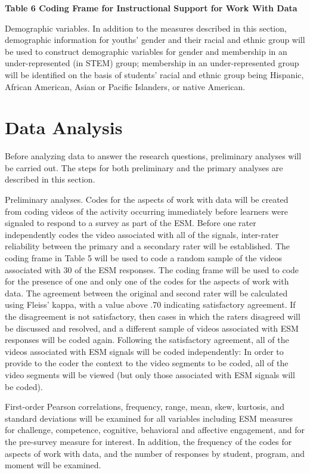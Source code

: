 \documentclass[]{book}
\theoremstyle{definition}
\theoremstyle{definition}
\theoremstyle{definition}
\theoremstyle{remark}
\begin{document}
\textbf{Table 6 Coding Frame for Instructional Support for Work With
Data}

Demographic variables. In addition to the measures described in this
section, demographic information for youths' gender and their racial and
ethnic group will be used to construct demographic variables for gender
and membership in an under-represented (in STEM) group; membership in an
under-represented group will be identified on the basis of students'
racial and ethnic group being Hispanic, African American, Asian or
Pacific Islanders, or native American.

\section{Data Analysis}\label{data-analysis}

Before analyzing data to answer the research questions, preliminary
analyses will be carried out. The steps for both preliminary and the
primary analyses are described in this section.

Preliminary analyses. Codes for the aspects of work with data will be
created from coding videos of the activity occurring immediately before
learners were signaled to respond to a survey as part of the ESM. Before
one rater independently codes the video associated with all of the
signals, inter-rater reliability between the primary and a secondary
rater will be established. The coding frame in Table 5 will be used to
code a random sample of the videos associated with 30 of the ESM
responses. The coding frame will be used to code for the presence of one
and only one of the codes for the aspects of work with data. The
agreement between the original and second rater will be calculated using
Fleiss' kappa, with a value above .70 indicating satisfactory agreement.
If the disagreement is not satisfactory, then cases in which the raters
disagreed will be discussed and resolved, and a different sample of
videos associated with ESM responses will be coded again. Following the
satisfactory agreement, all of the videos associated with ESM signals
will be coded independently: In order to provide to the coder the
context to the video segments to be coded, all of the video segments
will be viewed (but only those associated with ESM signals will be
coded).

First-order Pearson correlations, frequency, range, mean, skew,
kurtosis, and standard deviations will be examined for all variables
including ESM measures for challenge, competence, cognitive, behavioral
and affective engagement, and for the pre-survey measure for interest.
In addition, the frequency of the codes for aspects of work with data,
and the number of responses by student, program, and moment will be
examined.
\end{document}
